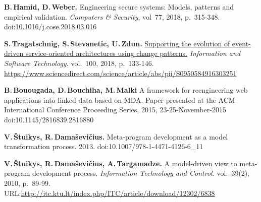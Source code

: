 \documentclass[runningheads]{llncs}
\begin{document}
\begin{thebibliography}{11}
\textbf{B.\,Hamid, D.\,Weber.} Engineering secure systems: Models, patterns
and empirical validation. \emph{Computers \& Security},  vol~77, 2018, p.~315-348.
\href{https://www.sciencedirect.com/science/article/pii/S0167404818303043}{doi:10.1016/j.cose.2018.03.016}


\textbf{S.\,Tragatschnig, S.\,Stevanetic, U.\,Zdun.} \href{https://www.sciencedirect.com/science/article/abs/pii/S0950584916303251}{Supporting the
evolution of event-driven service-oriented architectures using change
patterns.} \emph{Information and Software Technology.} vol.~100, 2018, p.~133-146. \href{doi:10.1016/j.infsof.2018.04.005}{https://www.sciencedirect.com/science/article/abs/pii/S0950584916303251}



\textbf{B.\,Bouougada, D.\,Bouchiha, M.\,Malki} A framework for
reengineering web applications into linked data based on MDA. Paper
presented at the ACM International Conference Proceeding Series, 2015,
23-25-November-2015 doi:10.1145/2816839.2816880


\textbf{V.\,\v{S}tuikys, R.\,Dama\v{s}evi\v{c}ius.} Meta-program development as a
model transformation process. 2013. doi:10.1007/978-1-4471-4126-6\_11

\textbf{V.\,\v{S}tuikys, R.\,Dama\v{s}evi\v{c}ius, A.\,Targamadze.} A model-driven
view to meta-program development process. \emph{Information Technology and
Control.} vol.~39(2), 2010, p.~89-99. URL:\url{http://itc.ktu.lt/index.php/ITC/article/download/12302/6838}


\end{thebibliography}




\end{document}
